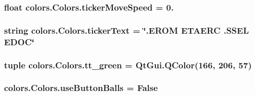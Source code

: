 \subsubsection[{ticker\+Move\+Speed}]{\setlength{\rightskip}{0pt plus 5cm}float colors.\+Colors.\+ticker\+Move\+Speed = 0.\hspace{0.3cm}{\ttfamily [static]}}\label{classcolors_1_1Colors_a9d972783905d5f5c8030dbf627fd5a1a}
\hypertarget{classcolors_1_1Colors_a6e447469a7ab67f5ec55a4a529cb4efc}{}
\subsubsection[{ticker\+Text}]{\setlength{\rightskip}{0pt plus 5cm}string colors.\+Colors.\+ticker\+Text = \char`\"{}.E\+R\+O\+M E\+T\+A\+E\+R\+C .S\+S\+E\+L E\+D\+O\+C\char`\"{}\hspace{0.3cm}{\ttfamily [static]}}\label{classcolors_1_1Colors_a6e447469a7ab67f5ec55a4a529cb4efc}
\hypertarget{classcolors_1_1Colors_a3dce7d4d8c4c605c9a9dc960b1e6c619}{}
\subsubsection[{tt\+\_\+green}]{\setlength{\rightskip}{0pt plus 5cm}tuple colors.\+Colors.\+tt\+\_\+green = Qt\+Gui.\+Q\+Color(166, 206, 57)\hspace{0.3cm}{\ttfamily [static]}}\label{classcolors_1_1Colors_a3dce7d4d8c4c605c9a9dc960b1e6c619}
\hypertarget{classcolors_1_1Colors_ad29910133e8913f0d99562ced0f83700}{}
\subsubsection[{use\+Button\+Balls}]{\setlength{\rightskip}{0pt plus 5cm}colors.\+Colors.\+use\+Button\+Balls = {\bf False}\hspace{0.3cm}{\ttfamily [static]}}\label{classcolors_1_1Colors_ad29910133e8913f0d99562ced0f83700}
\hypertarget{classcolors_1_1Colors_a7b80d4e45b227fae9e803d6cf5c9ec7e}{}
